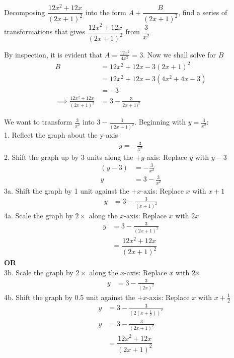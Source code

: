 \documentclass[12pt, a4 paper]{article}
\begin{document}
\begin{outline}[enumerate]
 \1 Decomposing \(\dfrac{12x^2+12x}{{(2x+1)}^2}\) into the form \(A + \dfrac{B}{{(2x+1)}^2}\), find a series of transformations that gives \(\dfrac{12x^2+12x}{{(2x+1)}^2}\) from \(\dfrac{3}{x^2}\)
 \begin{answer}
  By inspection, it is evident that \(A = \frac{12x^2}{4x^2} = 3\). Now we shall solve for \(B\)
  \begin{align*}
   B                                     & = 12x^2 + 12x - 3{(2x+1)}^2     \\
                                         & = 12x^2 + 12x - 3(4x^2 + 4x -3) \\
                                         & = -3                            \\
   \implies \frac{12x^2+12x}{{(2x+1)}^2} & = 3-\frac{3}{{2x+1)}^2}
  \end{align*}

  We want to transform \(\frac{3}{x^2}\) into \(3 - \frac{3}{{(2x+1)}^2}\). Beginning with \(y=\frac{3}{x^2}\):\\
  1. Reflect the graph about the y-axis
  \begin{align*}
   y =- \frac{3}{x^2}
  \end{align*}
  2. Shift the graph up by 3 units along the \(+y\)-axis: Replace \(y\) with \(y-3\)
  \begin{align*}
   (y-3) & = -\frac{3}{x^2}    \\
   y     & = 3 - \frac{3}{x^2}
  \end{align*}
  3a. Shift the graph by 1 unit against the \(+x\)-axis: Replace \(x\) with \(x+1\)
  \begin{align*}
   y & = 3 - \frac{3}{{(x+1)}^2}
  \end{align*}
  4a. Scale the graph by \(2\times \) along the \(x\)-axis: Replace \(x\) with \(2x\)
  \begin{align*}
   y & = 3 - \frac{3}{{(2x+1)}^2}     \\
     & =\dfrac{12x^2+12x}{{(2x+1)}^2}
  \end{align*}
  \color{red}\textbf{OR}\color{blue} \\
  3b.  Scale the graph by \(2\times \) along the \(x\)-axis: Replace \(x\) with \(2x\)
  \begin{align*}
   y & = 3 - \frac{3}{{(2x)}^2}
  \end{align*}
  4b. Shift the graph by 0.5 unit against the \(+x\)-axis: Replace \(x\) with \(x+\frac{1}{2}\)
  \begin{align*}
   y & = 3 - \frac{3}{{(2(x+\frac{1}{2}))}^2} \\
   y & = 3 - \frac{3}{{(2x+1)}^2}             \\
     & = \dfrac{12x^2+12x}{{(2x+1)}^2}
  \end{align*}

 \end{answer}

\end{outline}
\end{document}
